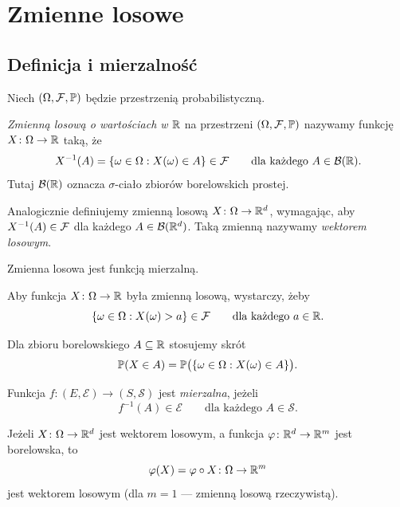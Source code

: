\chapter{Zmienne losowe}
\label{chap:zmienne-losowe}

\section{Definicja i mierzalność}
\label{sec:definicja-zmiennej-losowej}

Niech $(\Omega,\mathcal{F},\mathbb{P})$ będzie przestrzenią probabilistyczną.

\begin{definicja}
\label{def:zmienna-losowa}
\emph{Zmienną losową o wartościach w $\mathbb{R}$} na przestrzeni
$(\Omega,\mathcal{F},\mathbb{P})$ nazywamy funkcję $X\colon\Omega\to\mathbb{R}$ taką, że
\[
  X^{-1}(A)=\{\omega\in\Omega:X(\omega)\in A\}\in\mathcal{F}
  \qquad\text{dla każdego }A\in\mathcal{B}(\mathbb{R}).
\]
Tutaj $\mathcal{B}(\mathbb{R})$ oznacza $\sigma$-ciało zbiorów borelowskich prostej.
\end{definicja}

\begin{uwaga}
Analogicznie definiujemy zmienną losową $X\colon\Omega\to\mathbb{R}^d$,
wymagając, aby $X^{-1}(A)\in\mathcal{F}$ dla każdego $A\in\mathcal{B}(\mathbb{R}^d)$.
Taką zmienną nazywamy \emph{wektorem losowym}.
\end{uwaga}

\begin{uwaga}
Zmienna losowa jest funkcją mierzalną.
\end{uwaga}

\begin{uwaga}
Aby funkcja $X\colon\Omega\to\mathbb{R}$ była zmienną losową, wystarczy,
żeby
\[
  \{\omega\in\Omega:X(\omega)>a\}\in\mathcal{F}
  \qquad\text{dla każdego }a\in\mathbb{R}.
\]
\end{uwaga}

\begin{uwaga}
Dla zbioru borelowskiego $A\subseteq\mathbb{R}$ stosujemy skrót
\[
  \mathbb{P}(X\in A)=\mathbb{P}\bigl(\{\omega\in\Omega:X(\omega)\in A\}\bigr).
\]
\end{uwaga}

\begin{uwaga}
Funkcja $f\colon(E,\mathcal E)\to(S,\mathcal S)$ jest
\emph{mierzalna}, jeżeli
\[
  f^{-1}(A)\in\mathcal E
  \qquad\text{dla każdego }A\in\mathcal S.
\]
\end{uwaga}

\begin{fakt}
\label{fakt:zlozenie-zmiennej-losowej}
Jeżeli $X\colon\Omega\to\mathbb{R}^d$ jest wektorem losowym, a funkcja
$\varphi\colon\mathbb{R}^d\to\mathbb{R}^m$ jest borelowska, to
\[
  \varphi(X)=\varphi\circ X\colon\Omega\to\mathbb{R}^m
\]
jest wektorem losowym (dla $m=1$ --- zmienną losową rzeczywistą).
\end{fakt}

